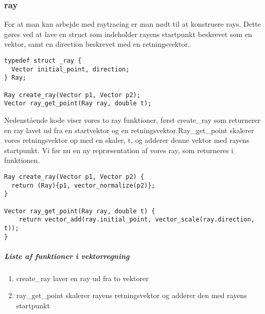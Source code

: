 \subsubsection{ray}
For at man kan arbejde med raytracing er man nødt til at konstruere rays. Dette gøres ved at lave en struct som indeholder rayens startpunkt beskrevet som en vektor, samt en direction beskrevet med en retningsvektor. 

\begin{lstlisting}[style=Cstyle, caption=ray funktioner og struct]
typedef struct _ray {
  Vector initial_point, direction;
} Ray;

Ray create_ray(Vector p1, Vector p2);
Vector ray_get_point(Ray ray, double t);
\end{lstlisting}

Nedenstående kode viser vores to ray funktioner, først create\_ray som returnerer en ray lavet ud fra en startvektor og en retningsvektor.\newline Ray\_get\_point skalerer vores retningsvektor op med en skaler, t, og adderer denne vektor med rayens startpunkt. Vi før nu en ny repræsentation af vores ray, som returneres i funktionen.

\begin{lstlisting}[style=Cstyle, caption=funktionerne create\_ray og ray\_get\_point]
Ray create_ray(Vector p1, Vector p2) {
  return (Ray){p1, vector_normalize(p2)};
}

Vector ray_get_point(Ray ray, double t) {
    return vector_add(ray.initial_point, vector_scale(ray.direction, t));
}
\end{lstlisting}

\subparagraph{Liste af funktioner i vektorregning}
\begin{enumerate}
  
  \item create\_ray laver en ray ud fra to vektorer
  \item ray\_get\_point skalerer rayens retningsvektor og adderer den med rayens startpunkt
  
\end{enumerate}

